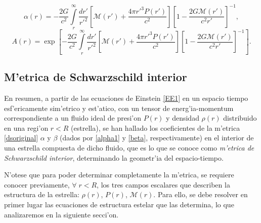 \begin{equation}\label{alpha1}
\boxed{\alpha(r)=-\frac{2G}{c^2}\int\limits_r^{\infty}\frac{dr'}{r'^2}\left[ \mathcal{M}(r')+\frac{4\pi r'^3P(r')}{c^2}\right]\left[ 1-\frac{2G\mathcal{M}(r')}{c^2r'}\right]^{-1},}
\end{equation}
\begin{equation}\label{alpha2}
\boxed{A(r)=\exp{\left[-\frac{2G}{c^2}\int\limits_r^{\infty}\frac{dr'}{r'^2}\left[ \mathcal{M}(r')+\frac{4\pi r'^3P(r')}{c^2}\right]\left[ 1-\frac{2G\mathcal{M}(r')}{c^2r'}\right]^{-1}\right]}.}
\end{equation}

\subsection{M'etrica de Schwarzschild interior}

En resumen, a partir de las ecuaciones de Einstein \eqref{EE1} en un espacio tiempo esf'ericamente sim'etrico y est'atico, con un tensor de energ'ia-momentum correspondiente a un fluido ideal de presi'on $P(r)$ y densidad $\rho(r)$ distribuido en una regi'on $r<R$ (estrella), se han hallado los coeficientes de la m'etrica \eqref{dsoriginal} $\alpha$  y $\beta$ (dados por \eqref{alpha1} y \eqref{beta}, respectivamente) en el interior de una estrella compuesta de dicho fluido, que es lo que se conoce como \emph{m'etrica de Schwarzschild interior}, determinando la geometr'ia del espacio-tiempo.

N'otese que para poder determinar completamente la m'etrica, se requiere conocer previamente, $\forall \;r<R$, los tres campos escalares que describen la estructura de la estrella: $\rho(r)$, $P(r)$, $\mathcal{M}(r)$. Para ello, se debe resolver en primer lugar las ecuaciones de estructura estelar que las determina, lo que analizaremos en la siguiente secci'on.

